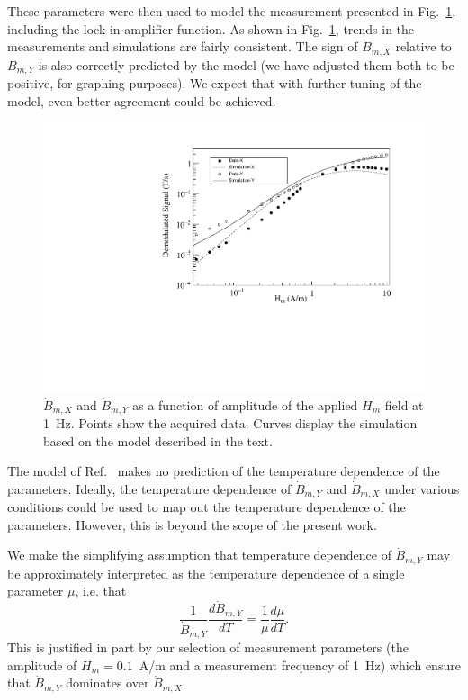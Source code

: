 These parameters were then used to model the measurement presented in
Fig.~\ref{fig:data_and_simulation}, including the lock-in amplifier
function.  As shown in Fig.~\ref{fig:data_and_simulation}, trends in
the measurements and simulations are fairly consistent.  The sign of
$\dot{B}_{m,X}$ relative to $\dot{B}_{m,Y}$ is also correctly
predicted by the model (we have adjusted them both to be positive, for
graphing purposes).  We expect that with further tuning of the model,
even better agreement could be achieved.

\begin{figure}[h!]
  \begin{center}
    \includegraphics[width=\textwidth]{Jiles_and_data.pdf}
    \caption{$\dot{B}_{m,X}$ and $\dot{B}_{m,Y}$ as a function of
      amplitude of the applied $H_m$ field at 1~Hz.  Points show the
      acquired data.  Curves display the simulation based on the model
      described in the text.}
    \label{fig:data_and_simulation}
  \end{center}
\end{figure} 

The model of Ref.~\cite{jiles1994frequency} makes no prediction of the
temperature dependence of the parameters.  Ideally, the temperature
dependence of $\dot{B}_{m,Y}$ and $\dot{B}_{m,X}$ under various
conditions could be used to map out the temperature dependence of the
parameters.  However, this is beyond the scope of the present work.

We make the simplifying assumption that temperature dependence of
$\dot{B}_{m,Y}$ may be approximately interpreted as the temperature
dependence of a single parameter $\mu$, i.e. that
\begin{equation}
\frac{1}{\dot{B}_{m,Y}}\frac{d\dot{B}_{m,Y}}{dT}=\frac{1}{\mu}\frac{d\mu}{dT}.
\end{equation}
This is justified in part by our selection of measurement parameters
(the amplitude of $H_m=0.1$~A/m and a measurement frequency of 1~Hz)
which ensure that $\dot{B}_{m,Y}$ dominates over $\dot{B}_{m,X}$.

